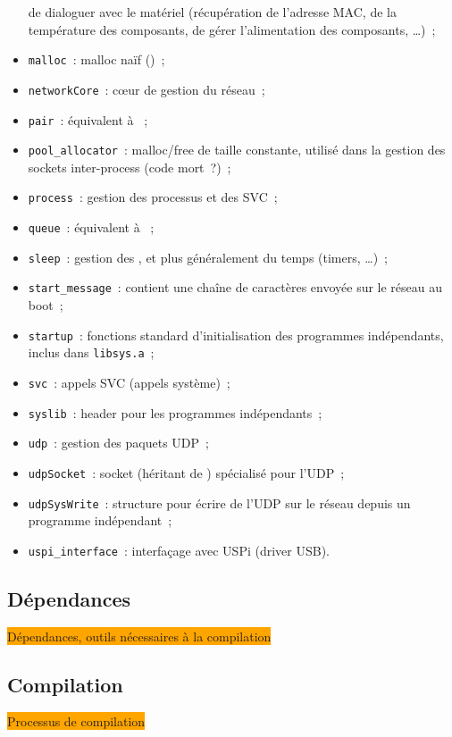 \documentclass[11pt,a4paper]{article}
\newcommand{\fname}[1]{\texttt{#1}} %
\newcommand{\todo}[1]{\colorbox{orange}{\color{blue}{\Large TODO:} #1}}
\begin{document}
\begin{itemize}
		de dialoguer avec le matériel (récupération de l'adresse MAC, 
		de la température des composants, de gérer l'alimentation des
		composants, \ldots)~;
	\item \fname{malloc}~: malloc naïf ()~;
	\item \fname{networkCore}~: cœur de gestion du réseau~;
	\item \fname{pair}~: équivalent à ~;
	\item \fname{pool\_allocator}~: malloc/free de taille constante, utilisé
		dans la gestion des sockets inter-process (code mort~?)~;
	\item \fname{process}~: gestion des processus et des SVC~;
	\item \fname{queue}~: équivalent à ~;
	\item \fname{sleep}~: gestion des , et plus généralement
		du temps (timers, \ldots)~;
	\item \fname{start\_message}~: contient une chaîne de caractères envoyée
		sur le réseau au boot~;
	\item \fname{startup}~: fonctions standard d'initialisation des programmes
		indépendants, inclus dans \fname{libsys.a}~;
	\item \fname{svc}~: appels SVC (appels système)~;
	\item \fname{syslib}~: header pour les programmes indépendants~;
	\item \fname{udp}~: gestion des paquets UDP~;
	\item \fname{udpSocket}~: socket (héritant de )
		spécialisé pour l'UDP~;
	\item \fname{udpSysWrite}~: structure pour écrire de l'UDP sur le
		réseau depuis un programme indépendant~;
	\item \fname{uspi\_interface}~: interfaçage avec USPi (driver USB).
\end{itemize}

\subsection{Dépendances}
\todo{Dépendances, outils nécessaires à la compilation}

\subsection{Compilation}
\todo{Processus de compilation}

\end{document}
